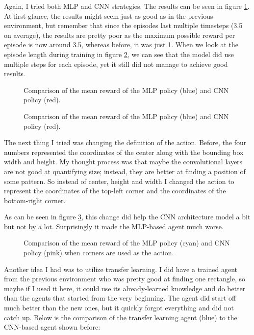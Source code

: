 \documentclass[
  digital,     %
  oneside,     %
  nosansbold,  %
  nocolorbold, %
  lof,         %
  lot,         %
]{fithesis4}
\begin{document}
Again, I tried both MLP and CNN strategies. The results can be seen in figure \ref{fig:v3_mlp_cnn}. At first glance, the results might seem just as good as in the previous environment, but remember that since the episodes last multiple timesteps (3.5 on average), the results are pretty poor as the maximum possible reward per episode is now around 3.5, whereas before, it was just 1. When we look at the episode length during training in figure \ref{fig:v3_len}, we can see that the model did use multiple steps for each episode, yet it still did not manage to achieve good results.

\begin{figure}
    \centering
    \makebox[\textwidth][c]{}
    \caption{Comparison of the mean reward of the MLP policy (blue) and CNN policy (red).}
    \label{fig:v3_mlp_cnn}
\end{figure}

\begin{figure}
    \centering
    \makebox[\textwidth][c]{}
    \caption{Comparison of the mean reward of the MLP policy (blue) and CNN policy (red).}
    \label{fig:v3_len}
\end{figure}

The next thing I tried was changing the definition of the action. Before, the four numbers represented the coordinates of the center along with the bounding box width and height. My thought process was that maybe the convolutional layers are not good at quantifying size; instead, they are better at finding a position of some pattern. So instead of center, height and width I changed the action to represent the coordinates of the top-left corner and the coordinates of the bottom-right corner. 

As can be seen in figure \ref{fig:v3_corner}, this change did help the CNN architecture model a bit but not by a lot. Surprisingly it made the MLP-based agent much worse.

\begin{figure}
    \centering
    \makebox[\textwidth][c]{}
    \caption{Comparison of the mean reward of the MLP policy (cyan) and CNN policy (pink) when corners are used as the action.}
    \label{fig:v3_corner}
\end{figure}

Another idea I had was to utilize transfer learning. I did have a trained agent from the previous environment who was pretty good at finding one rectangle, so maybe if I used it here, it could use its already-learned knowledge and do better than the agents that started from the very beginning. The agent did start off much better than the new ones, but it quickly forgot everything and did not catch up. Below is the comparison of the transfer learning agent (blue) to the CNN-based agent shown before:
\end{document}
